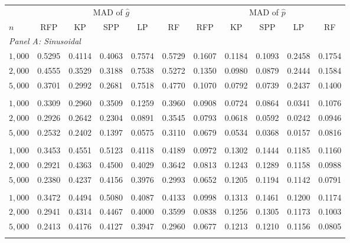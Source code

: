 \begin{tabular}{l@{\hspace{2em}}ccccc@{\hspace{2em}}ccccc}
\toprule
&
\multicolumn{5}{c}{MAD of $\widehat{g}$}
&
\multicolumn{5}{c}{MAD of $\widehat{p}$}
\\
\cmidrule(lr){2-6}
\cmidrule(lr){7-11}
$n$
& RFP & KP & SPP & LP & RF
& RFP & KP & SPP & LP & RF
\\
\midrule

	\multicolumn{11}{l}{\textit{Panel A: Sinusoidal}}\\
	$1{,}000$
	& 0.5295 & 0.4114 & 0.4063 & 0.7574 & 0.5729
	& 0.1607 & 0.1184 & 0.1093 & 0.2458 & 0.1754
	\\
	$2{,}000$
	& 0.4555 & 0.3529 & 0.3188 & 0.7538 & 0.5272
	& 0.1350 & 0.0980 & 0.0879 & 0.2444 & 0.1584
	\\
	$5{,}000$
	& 0.3701 & 0.2992 & 0.2681 & 0.7518 & 0.4770
	& 0.1070 & 0.0792 & 0.0739 & 0.2437 & 0.1400
	\\
	\addlinespace

	\multicolumn{11}{l}{\textit{Panel B: Sigmoid, $\kappa=1$}}\\
	$1{,}000$
	& 0.3309 & 0.2960 & 0.3509 & 0.1259 & 0.3960
	& 0.0908 & 0.0724 & 0.0864 & 0.0341 & 0.1076
	\\
	$2{,}000$
	& 0.2926 & 0.2642 & 0.2304 & 0.0891 & 0.3545
	& 0.0793 & 0.0618 & 0.0592 & 0.0242 & 0.0946
	\\
	$5{,}000$
	& 0.2532 & 0.2402 & 0.1397 & 0.0575 & 0.3110
	& 0.0679 & 0.0534 & 0.0368 & 0.0157 & 0.0816
	\\
	\addlinespace

	\multicolumn{11}{l}{\textit{Panel C: Sigmoid, $\kappa=100$}}\\
	$1{,}000$
	& 0.3453 & 0.4551 & 0.5123 & 0.4118 & 0.4189
	& 0.0972 & 0.1302 & 0.1444 & 0.1185 & 0.1160
	\\
	$2{,}000$
	& 0.2921 & 0.4363 & 0.4500 & 0.4029 & 0.3642
	& 0.0813 & 0.1243 & 0.1289 & 0.1158 & 0.0988
	\\
	$5{,}000$
	& 0.2380 & 0.4237 & 0.4156 & 0.3976 & 0.2993
	& 0.0652 & 0.1205 & 0.1194 & 0.1142 & 0.0791
	\\
	\addlinespace

	\multicolumn{11}{l}{\textit{Panel D: Threshold}}\\
	$1{,}000$
	& 0.3472 & 0.4494 & 0.5080 & 0.4087 & 0.4133
	& 0.0998 & 0.1313 & 0.1461 & 0.1200 & 0.1174
	\\
	$2{,}000$
	& 0.2941 & 0.4314 & 0.4467 & 0.4000 & 0.3599
	& 0.0838 & 0.1256 & 0.1305 & 0.1173 & 0.1003
	\\
	$5{,}000$
	& 0.2413 & 0.4176 & 0.4127 & 0.3947 & 0.2960
	& 0.0677 & 0.1213 & 0.1210 & 0.1156 & 0.0805
	\\
	\addlinespace


\end{tabular}
